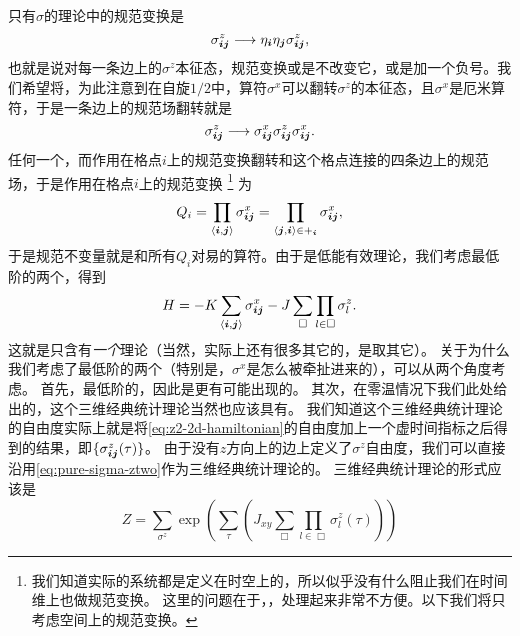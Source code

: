 只有$\sigma$的理论中的规范变换是
\begin{equation}
    {\sigma}_{\vb*{i} \vb*{j}}^z \longrightarrow \eta_{\vb*{i}} \eta_{\vb*{j}} {\sigma}_{\vb*{i} \vb*{j}}^z,
    \label{eq:pure-sigma-ztwo}
\end{equation}
也就是说对每一条边上的${\sigma}^z$本征态，规范变换或是不改变它，或是加一个负号。我们希望将，为此注意到在自旋$1/2$中，算符${\sigma}^x$可以翻转${\sigma}^z$的本征态，且${\sigma}^x$是厄米算符，于是一条边上的规范场翻转就是
\[
    {\sigma}_{\vb*{i} \vb*{j}}^z \longrightarrow {\sigma}^x_{\vb*{i} \vb*{j}} {\sigma}_{\vb*{i} \vb*{j}}^z {\sigma}^x_{\vb*{i} \vb*{j}}.
\]
任何一个，而作用在格点$i$上的规范变换翻转和这个格点连接的四条边上的规范场，于是作用在格点$i$上的规范变换
\footnote{
    我们知道实际的系统都是定义在时空上的，所以似乎没有什么阻止我们在时间维上也做规范变换。
    这里的问题在于，，处理起来非常不方便。以下我们将只考虑空间上的规范变换。
}%
为
\begin{equation}
    {Q}_i = \prod_{\langle \vb*{i}, \vb*{j} \rangle} {\sigma}^x_{\vb*{i} \vb*{j}} = \prod_{\langle \vb*{j}, \vb*{i} \rangle \in +_{\vb*{i}}} {\sigma}^x_{\vb*{i} \vb*{j}},
    \label{eq:z2-charge}
\end{equation}
于是规范不变量就是和所有${Q}_i$对易的算符。由于是低能有效理论，我们考虑最低阶的两个，得到
\begin{equation}
    {H} = - K \sum_{\langle \vb*{i}, \vb*{j} \rangle} {\sigma}^x_{\vb*{i} \vb*{j}} - J \sum_{\Box} \prod_{l \in \Box} {\sigma}^z_{l}.
    \label{eq:z2-2d-hamiltonian}
\end{equation}
这就是只含有\emph{一个}理论（当然，实际上还有很多其它的，是取其它）。
关于为什么我们考虑了最低阶的两个（特别是，${\sigma}^x$是怎么被牵扯进来的），可以从两个角度考虑。
首先，最低阶的，因此是更有可能出现的。
其次，在零温情况下我们此处给出的，这个三维经典统计理论当然也应该具有。
我们知道这个三维经典统计理论的自由度实际上就是将\eqref{eq:z2-2d-hamiltonian}的自由度加上一个虚时间指标之后得到的结果，即$\{\sigma^z_{\vb*{i} \vb*{j}}(\tau)\}$。
由于没有$z$方向上的边上定义了$\sigma^z$自由度，我们可以直接沿用\eqref{eq:pure-sigma-ztwo}作为三维经典统计理论的。
三维经典统计理论的形式应该是
\[
    Z = \sum_{\sigma^z} \exp(\sum_{\tau} (J_{xy} \sum_{\Box} \prod_{l \in \Box} \sigma_l^z(\tau)  ) )
\]

